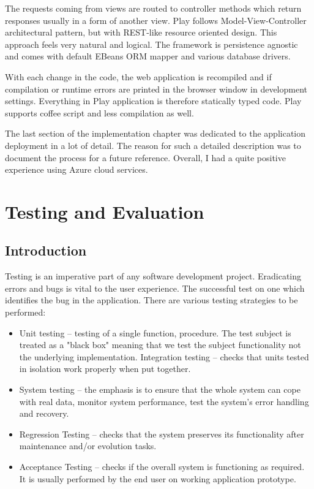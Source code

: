 \documentclass[12pt,twoside,a4paper]{report}
\begin{document}
The requests coming from views are routed to controller methods which return responses usually in a form of another view. Play follows Model-View-Controller architectural pattern, but with REST-like resource oriented design. This approach feels very natural and logical. The framework is persistence agnostic and comes with default EBeans ORM mapper and various database drivers.

With each change in the code, the web application is recompiled and if compilation or runtime errors are printed in the browser window in development settings. Everything in Play application is therefore statically typed code. Play supports coffee script and less compilation as well.

The last section of the implementation chapter was dedicated to the application deployment in a lot of detail. The reason for such a detailed description was to document the process for a future reference. Overall, I had a quite positive experience using Azure cloud services.









\chapter{Testing and Evaluation}\label{5}

\section{Introduction}\label{5.1}
Testing is an imperative part of any software development project. Eradicating errors and bugs is vital to the user experience. The successful test on one which identifies the bug in the application. There are various testing strategies to be performed:
\begin{itemize}\itemsep1pt \parskip0pt 
\item Unit testing – testing of a single function, procedure. The test subject is treated as a "black box" meaning that we test the subject functionality not the underlying implementation.
Integration testing – checks that units tested in isolation work properly when put together.
\item System testing – the emphasis is to ensure that the whole system can cope with real data, monitor system performance, test the system’s error handling and recovery.
\item Regression Testing – checks that the system preserves its functionality after maintenance and/or evolution tasks.
\item Acceptance Testing – checks if the overall system is functioning as required. It is usually performed by the end user on working application prototype.
\end{itemize}
\end{document}
